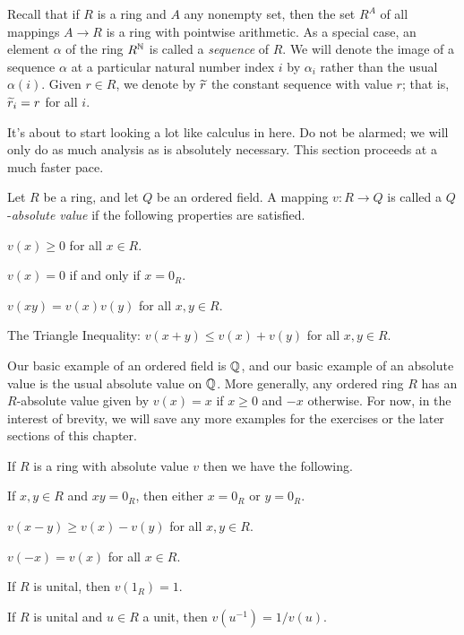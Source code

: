 Recall that if \(R\) is a ring and \(A\) any nonempty set, then the set \(R^A\) of all mappings \(A \rightarrow R\) is a ring with pointwise arithmetic.
As a special case, an element \(\alpha\) of the ring \(R^{\mathbb{N}}\) is called a \emph{sequence} of \(R\).
We will denote the image of a sequence \(\alpha\) at a particular natural number index \(i\) by \(\alpha_i\) rather than the usual \(\alpha(i)\).
Given \(r \in R\), we denote by \(\widetilde{r}\) the constant sequence with value \(r\); that is, \(\widetilde{r}_i = r\) for all \(i\).

It's about to start looking a lot like calculus in here.
Do not be alarmed; we will only do as much analysis as is absolutely necessary.
This section proceeds at a much faster pace.

\begin{dfn} \label{dfn:abs-val}
Let \(R\) be a ring, and let \(Q\) be an ordered field.
A mapping \(v : R \rightarrow Q\) is called a \(Q\)-\emph{absolute value} if the following properties are satisfied.
\begin{proplist}
\item \(v(x) \geq 0\) for all \(x \in R\).
\item \(v(x) = 0\) if and only if \(x = 0_R\).
\item \(v(xy) = v(x)v(y)\) for all \(x,y \in R\).
\item The Triangle Inequality: \(v(x+y) \leq v(x) + v(y)\) for all \(x,y \in R\).
\end{proplist}
\end{dfn}

Our basic example of an ordered field is \(\mathbb{Q}\), and our basic example of an absolute value is the usual absolute value on \(\mathbb{Q}\).
More generally, any ordered ring \(R\) has an \(R\)-absolute value given by \(v(x) = x\) if \(x \geq 0\) and \(-x\) otherwise.
For now, in the interest of brevity, we will save any more examples for the exercises or the later sections of this chapter.

\begin{prop} \label{prop:abs-val-basics}
If \(R\) is a ring with absolute value \(v\) then we have the following.
\begin{proplist}
\item If \(x,y \in R\) and \(xy = 0_R\), then either \(x = 0_R\) or \(y = 0_R\).
\item \label{prop:abs-val-basics:reverse-ti} \(v(x-y) \geq v(x) - v(y)\) for all \(x,y \in R\).
\item \(v(-x) = v(x)\) for all \(x \in R\).
\item If \(R\) is unital, then \(v(1_R) = 1\).
\item If \(R\) is unital and \(u \in R\) a unit, then \(v(u^{-1}) = 1/v(u)\).
\end{proplist}
\end{prop}

